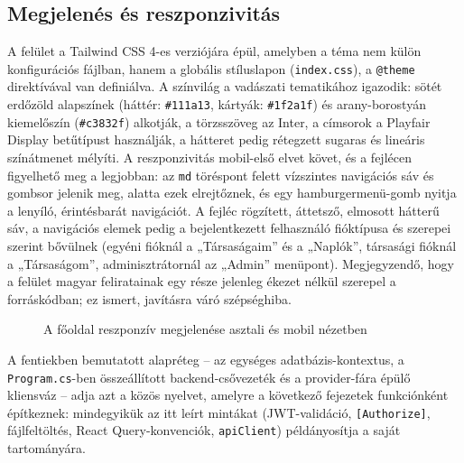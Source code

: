 \subsection{Megjelenés és reszponzivitás}

A felület a Tailwind CSS 4-es verziójára épül, amelyben a téma nem külön konfigurációs fájlban,
hanem a globális stíluslapon (\texttt{index.css}), a \texttt{@theme} direktívával van definiálva.
A színvilág a vadászati tematikához igazodik: sötét erdőzöld alapszínek (háttér:
\texttt{\#111a13}, kártyák: \texttt{\#1f2a1f}) és arany-borostyán kiemelőszín
(\texttt{\#c3832f}) alkotják, a törzsszöveg az Inter, a címsorok a Playfair Display betűtípust
használják, a hátteret pedig rétegzett sugaras és lineáris színátmenet mélyíti. A reszponzivitás
mobil-első elvet követ, és a fejlécen figyelhető meg a legjobban: az \texttt{md} töréspont felett
vízszintes navigációs sáv és gombsor jelenik meg, alatta ezek elrejtőznek, és egy
hamburgermenü-gomb nyitja a lenyíló, érintésbarát navigációt. A fejléc rögzített, áttetsző,
elmosott hátterű sáv, a navigációs elemek pedig a bejelentkezett felhasználó fióktípusa és
szerepei szerint bővülnek (egyéni fióknál a „Társaságaim” és a „Naplók”, társasági fióknál a
„Társaságom”, adminisztrátornál az „Admin” menüpont). Megjegyzendő, hogy a felület magyar
feliratainak egy része jelenleg ékezet nélkül szerepel a forráskódban; ez ismert, javításra váró
szépséghiba.

\begin{figure}[htbp]
	\centering
	\caption{A főoldal reszponzív megjelenése asztali és mobil nézetben}
	\label{fig:home-responsive}
\end{figure}

A fentiekben bemutatott alapréteg -- az egységes adatbázis-kontextus, a \texttt{Program.cs}-ben
összeállított backend-csővezeték és a provider-fára épülő kliensváz -- adja azt a közös nyelvet,
amelyre a következő fejezetek funkciónként építkeznek: mindegyikük az itt leírt mintákat
(JWT-validáció, \texttt{[Authorize]}, fájlfeltöltés, React Query-konvenciók,
\texttt{apiClient}) példányosítja a saját tartományára.
